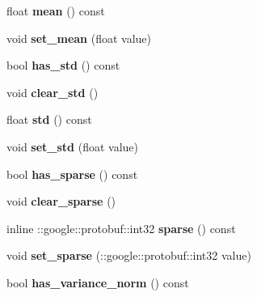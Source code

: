 \begin{DoxyCompactItemize}
float {\bfseries mean} () const
\item 
\mbox{\label{classcaffe_1_1_filler_parameter_a7b839f5e9527bbc17b2bd7031b31ddc1}} 
void {\bfseries set\+\_\+mean} (float value)
\item 
\mbox{\label{classcaffe_1_1_filler_parameter_a601a29c12f80101cba9cb9e6f87ece48}} 
bool {\bfseries has\+\_\+std} () const
\item 
\mbox{\label{classcaffe_1_1_filler_parameter_a4e679d7c27581d9551ceceb4fb83b88e}} 
void {\bfseries clear\+\_\+std} ()
\item 
\mbox{\label{classcaffe_1_1_filler_parameter_a528956cbf6fb368ce31a6182b1e760f7}} 
float {\bfseries std} () const
\item 
\mbox{\label{classcaffe_1_1_filler_parameter_aa89774cd218584b59623a20a09bee17c}} 
void {\bfseries set\+\_\+std} (float value)
\item 
\mbox{\label{classcaffe_1_1_filler_parameter_a2f4368ab3b442e6deaefaed253dd5c7e}} 
bool {\bfseries has\+\_\+sparse} () const
\item 
\mbox{\label{classcaffe_1_1_filler_parameter_aa571ec0e1019c0efe671fb97dc863832}} 
void {\bfseries clear\+\_\+sparse} ()
\item 
\mbox{\label{classcaffe_1_1_filler_parameter_a1c6aa1191a6cc7f8fcdbccf14c2b267b}} 
inline \+::google\+::protobuf\+::int32 {\bfseries sparse} () const
\item 
\mbox{\label{classcaffe_1_1_filler_parameter_a9ba27cb1cda0c5eaae334b861ef30e54}} 
void {\bfseries set\+\_\+sparse} (\+::google\+::protobuf\+::int32 value)
\item 
\mbox{\label{classcaffe_1_1_filler_parameter_ab8e11c82a064f4866450f530d4b8f054}} 
bool {\bfseries has\+\_\+variance\+\_\+norm} () const
\item 

\end{DoxyCompactItemize}
